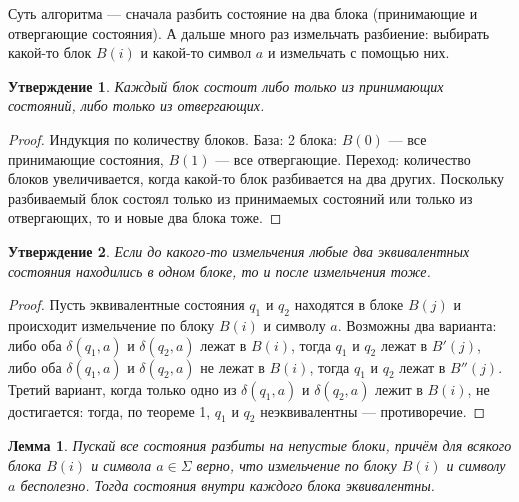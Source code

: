 \documentclass{article}
\newtheorem{lemma}{Лемма}
\newtheorem{statement}{Утверждение}
\begin{document}
Суть алгоритма --- сначала разбить состояние на два блока (принимающие и отвергающие состояния). А дальше много раз измельчать разбиение: выбирать какой-то блок $B(i)$ и какой-то символ $a$ и измельчать с помощью них.
\begin{statement} Каждый блок состоит либо только из принимающих состояний, либо только из отвергающих.
\end{statement}
\begin{proof}
Индукция по количеству блоков. База: 2 блока: $B(0)$ --- все принимающие состояния, $B(1)$ --- все отвергающие. Переход: количество блоков увеличивается, когда какой-то блок разбивается на два других. Поскольку разбиваемый блок состоял только из принимаемых состояний или только из отвергающих, то и новые два блока тоже.
\end{proof}
\begin{statement} Если до какого-то измельчения любые два эквивалентных состояния находились в одном блоке, то и после измельчения тоже.
\end{statement}
\begin{proof}
Пусть эквивалентные состояния $q_1$ и $q_2$ находятся в блоке $B(j)$ и происходит измельчение по блоку $B(i)$ и символу $a$. Возможны два варианта: либо оба $\delta(q_1, a)$ и $\delta(q_2, a)$ лежат в $B(i)$, тогда $q_1$ и $q_2$ лежат в $B'(j)$, либо оба $\delta(q_1, a)$ и $\delta(q_2, a)$ не лежат в $B(i)$, тогда $q_1$ и $q_2$ лежат в $B''(j)$. Третий вариант, когда только одно из $\delta(q_1, a)$ и $\delta(q_2, a)$ лежит в $B(i)$, не достигается: тогда, по теореме 1, $q_1$ и $q_2$ неэквивалентны --- противоречие.
\end{proof}
\begin{lemma}
Пускай все состояния разбиты на непустые блоки, причём для всякого блока $B(i)$ и символа $a \in \Sigma$ верно, что измельчение по блоку $B(i)$ и символу $a$ бесполезно. Тогда состояния внутри каждого блока эквивалентны. 
\end{lemma}
\end{document}
